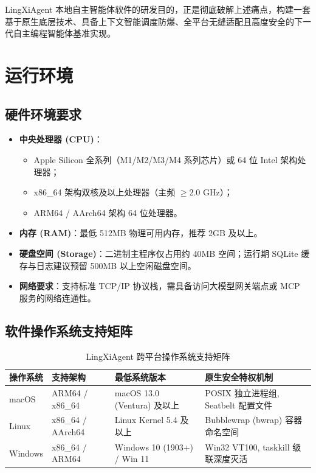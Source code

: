 \documentclass[11pt,a4paper]{article}
\begin{document}
LingXiAgent 本地自主智能体软件的研发目的，正是彻底破解上述痛点，构建一套基于原生底层技术、具备上下文智能调度防爆、全平台无缝适配且高度安全的下一代自主编程智能体基准实现。

\section{运行环境}

\subsection{硬件环境要求}
\begin{itemize}
    \item \textbf{中央处理器 (CPU)}：
    \begin{itemize}
        \item Apple Silicon 全系列（M1/M2/M3/M4 系列芯片）或 64 位 Intel 架构处理器；
        \item x86\_64 架构双核及以上处理器（主频 $\ge 2.0\text{ GHz}$）；
        \item ARM64 / AArch64 架构 64 位处理器。
    \end{itemize}
    \item \textbf{内存 (RAM)}：最低 512MB 物理可用内存，推荐 2GB 及以上。
    \item \textbf{硬盘空间 (Storage)}：二进制主程序仅占用约 40MB 空间；运行期 SQLite 缓存与日志建议预留 500MB 以上空闲磁盘空间。
    \item \textbf{网络要求}：支持标准 TCP/IP 协议栈，需具备访问大模型网关端点或 MCP 服务的网络连通性。
\end{itemize}

\subsection{软件操作系统支持矩阵}
\begin{table}[htbp]
\centering
\small
\begin{tabular}{llll}
\toprule
\textbf{操作系统} & \textbf{支持架构} & \textbf{最低系统版本} & \textbf{原生安全特权机制} \\
\midrule
macOS & ARM64 / x86\_64 & macOS 13.0 (Ventura) 及以上 & POSIX 独立进程组, Seatbelt 配置文件 \\
Linux & x86\_64 / AArch64 & Linux Kernel 5.4 及以上 & Bubblewrap (bwrap) 容器命名空间 \\
Windows & x86\_64 / ARM64 & Windows 10 (1903+) / Win 11 & Win32 VT100, taskkill 级联深度灭活 \\
\bottomrule
\end{tabular}
\caption{LingXiAgent 跨平台操作系统支持矩阵}
\end{table}
\end{document}
